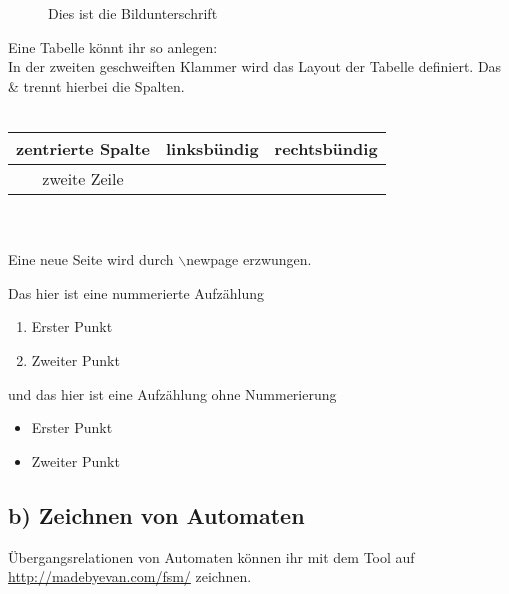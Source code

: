 \documentclass[a4paper]{scrartcl}
\begin{document}
\begin{figure}[H]
\centering
\caption{Dies ist die Bildunterschrift}
\end{figure}

Eine Tabelle könnt ihr so anlegen:\\
In der zweiten geschweiften Klammer wird das Layout der Tabelle definiert. 
Das \& trennt hierbei die Spalten.\\
\ \\ %
\begin{tabular}{c|lr}
  zentrierte Spalte & linksbündig & rechtsbündig\\
  \hline
  zweite Zeile & \\
\end{tabular}\\
\ \\
Eine neue Seite wird durch $\backslash$newpage erzwungen.
\newpage

Das hier ist eine nummerierte Aufzählung
\begin{enumerate}
\item Erster Punkt
\item Zweiter Punkt
\end{enumerate}

und das hier ist eine Aufzählung ohne Nummerierung
\begin{itemize}
\item Erster Punkt
\item Zweiter Punkt
\end{itemize}

\subsection*{b) Zeichnen von Automaten}

Übergangsrelationen von Automaten können ihr mit dem Tool auf
\url{http://madebyevan.com/fsm/} zeichnen. 
\end{document}
